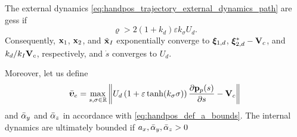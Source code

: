 \begin{prop}
    \label{prop:handpos_trajectory_path_following}
    The external dynamics \eqref{eq:handpos_trajectory_external_dynamics_path} are \glspl{ges} if
    \begin{equation}
        \varrho > 2\left(1 + k_d\right)\varepsilon k_{\sigma} U_d.
    \end{equation}
    Consequently, $\mathbf{x}_1$, $\mathbf{x}_2$, and $\tilde{\mathbf{x}}_I$ exponentially converge to $\bm{\xi}_{1, d}$, $\bm{\xi}_{2, d}^{*} - \mathbf{V}_c$, and $k_d/k_I\mathbf{V}_c$, respectively, and $\dot{s}$ converges to $U_d$.

    Moreover, let us define 
    \begin{equation}
        \Bar{\bm{\upsilon}}_e = \max_{s, \sigma \in \mathbb{R}} \left\|
            U_d\left(1 + \varepsilon\tanh(k_{\sigma}\sigma)\right) \frac{\partial \mathbf{p}_p(s)}{\partial s}
            - \mathbf{V}_c\right\|
            \label{eq:handpos_trajectory_LBnu_path}
    \end{equation}
    and $\Bar{\alpha}_y$ and $\Bar{\alpha}_z$ in accordance with \eqref{eq:handpos_def_a_bounds}.
    The internal dynamics are ultimately bounded if $a_x, \Bar{\alpha}_y, \Bar{\alpha}_z > 0$
\end{prop}

